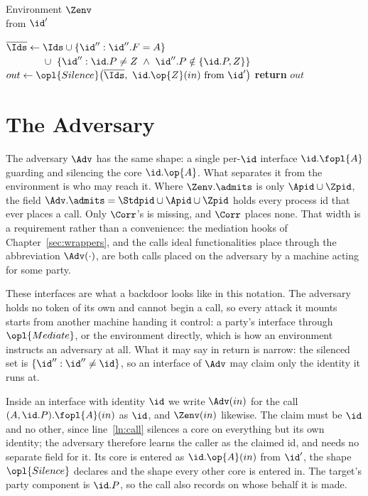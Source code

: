 \documentclass[10pt,oneside,openany]{book}
\theoremstyle{accentdef}
\theoremstyle{accentplain}
\begin{document}
\begin{interface}{Environment $\Zenv$ \\
}
 \quad from $\id'$
\begin{algorithmic}[1]
  \State $\overline{\Ids} \gets \Ids \cup \{\id'' : \id''.F = A \}$ \label{ln:zadv}
  \State $\phantom{\overline{\Ids} \gets {}} \cup\ \{\id'' : \id.P \neq Z \ \wedge\ \id''.P \notin \{\id.P, Z\}\}$
    \label{ln:zparty}
  \State $out \gets \opl{Silence}\bigl(\overline{\Ids},\ \id.\op{Z}(in) \text{ from } \id' \bigr)$
  \State \textbf{return} $out$
\end{algorithmic}
\end{interface}


\section{The Adversary}\label{sec:adv}

The adversary $\Adv$ has the same shape: a single per-$\id$ interface $\id.\fopl{A}$ guarding
and silencing the core $\id.\op{A}$. What separates it from the environment is who may reach it.
Where $\Zenv.\admits$ is only $\Apid \cup \Zpid$, the field
$\Adv.\admits = \Stdpid \cup \Apid \cup \Zpid$ holds every process id that ever places a call.
Only $\Corr$'s is missing, and $\Corr$ places none. That width is a requirement rather than a
convenience: the mediation hooks of Chapter~\ref{sec:wrappers}, and the calls ideal
functionalities place through the abbreviation $\Adv(\cdot)$, are both calls placed on the
adversary by a machine acting for some party.

These interfaces are what a backdoor looks like in this notation. The adversary holds no token of
its own and cannot begin a call, so every attack it mounts starts from another machine handing it
control: a party's interface through $\opl{Mediate}$, or the environment directly, which is how an
environment instructs an adversary at all. What it may say in return is narrow: the silenced set is
$\{\id'' : \id'' \ne \id\}$, so an interface of $\Adv$ may claim only the identity it runs at.

Inside an interface with identity $\id$ we write $\Adv(in)$ for the call
$(A,\id.P).\fopl{A}(in)$ as $\id$, and $\Zenv(in)$ likewise. The claim must be $\id$ and no other,
since line~\ref{ln:call} silences a core on everything but its own identity; the adversary
therefore learns the caller as the claimed id, and needs no separate field for it. Its core is
entered as $\id.\op{A}(in)$ from $\id'$, the shape $\opl{Silence}$ declares and the shape every
other core is entered in. The target's party component is $\id.P$, so the call also records on
whose behalf it is made.
\end{document}
